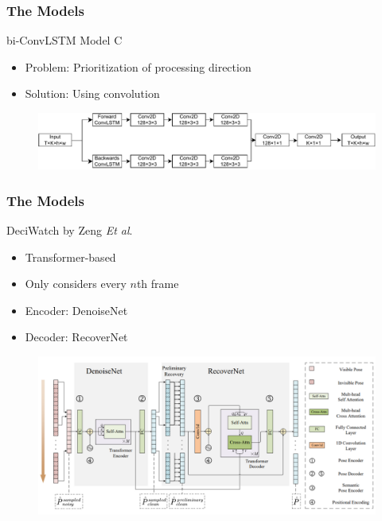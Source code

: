 \documentclass{beamer}
\begin{document}
\begin{frame}
    \frametitle{The Models}
    bi-ConvLSTM Model C
    \begin{itemize}
        \item<1-> Problem: Prioritization of processing direction
        \item<1-> Solution: Using convolution
    \end{itemize}
    \begin{figure}
        \centering
        \includegraphics[width = \textwidth]{../report/entities/unipose2.pdf}
    \end{figure}
\end{frame}

\begin{frame}
    \frametitle{The Models}
    DeciWatch by Zeng \textit{Et al}.
    \begin{itemize}
        \item<1-> Transformer-based
        \item<1-> Only considers every $n$th frame
        \item<1-> Encoder: DenoiseNet
        \item<1-> Decoder: RecoverNet
    \end{itemize}
    \begin{figure}
        \centering
        \includegraphics[width = \textwidth]{../report/entities/deciwatch.PNG}
    \end{figure}
\end{frame}
\end{document}
